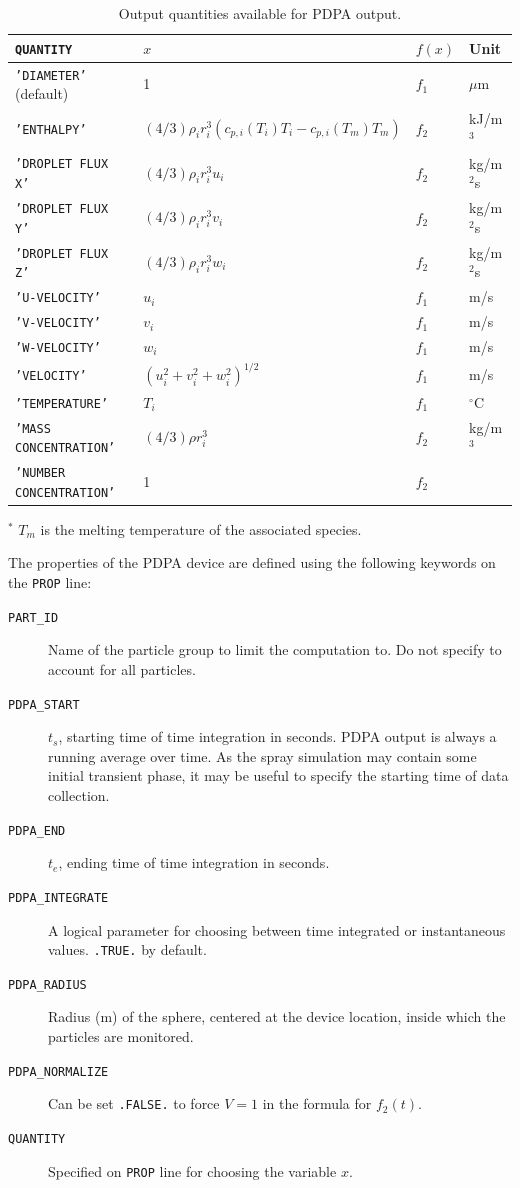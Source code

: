 \documentclass[11pt]{book}
\newcommand{\ct}{\tt\small}
\begin{document}
\begin{table}[!ht]
\caption{Output quantities available for PDPA output.}
\label{tbl:pdpa}
\begin{center}
\begin{tabular}{|l|l|l|l|}
\hline
{\ct QUANTITY} 	        & $x$   			& $f(x)$ & Unit \\ \hline
{\ct 'DIAMETER'} (default) & 1                          & $f_1$	 & $\mu$m \\
{\ct 'ENTHALPY'} 	& $(4/3)\rho_i r_i^3 \left(c_{p,i}(T_i)T_i-c_{p,i}(T_m)T_m \right)$	& $f_2$	 & kJ/m$^3$ \\
{\ct 'DROPLET FLUX X'} 	& $(4/3)\rho_i r_i^3 u_i$ 	& $f_2$	 & kg/m$^2$s \\
{\ct 'DROPLET FLUX Y'} 	& $(4/3)\rho_i r_i^3 v_i$ 	& $f_2$	 & kg/m$^2$s \\
{\ct 'DROPLET FLUX Z'} 	& $(4/3)\rho_i r_i^3 w_i$ 	& $f_2$	 & kg/m$^2$s \\
{\ct 'U-VELOCITY'} 	& $u_i$ 			& $f_1$	 & m/s \\
{\ct 'V-VELOCITY'} 	& $v_i$ 			& $f_1$	 & m/s \\
{\ct 'W-VELOCITY'}	& $w_i$ 			& $f_1$	 & m/s \\
{\ct 'VELOCITY'} 	& $(u_i^2+v_i^2+w_i^2)^{1/2}$ 	& $f_1$	 & m/s \\
{\ct 'TEMPERATURE'} 	& $T_i$				& $f_1$  & ${}^\circ$C \\
{\ct 'MASS CONCENTRATION'} & $(4/3)\rho r_i^3 $         & $f_2$  & kg/m$^3$ \\
{\ct 'NUMBER CONCENTRATION'} & 1                        & $f_2$  & \\
 \hline
\end{tabular}
\end{center}
${}^*$ $T_m$ is the melting temperature of the associated species.
\end{table}

The properties of the PDPA device are defined using the following keywords on the {\ct PROP} line:
\begin{description}
\item[{\ct PART\_ID}] Name of the particle group to limit the computation to. Do not specify to account for all particles.
\item[{\ct PDPA\_START}] $t_s$, starting time of time integration in seconds. PDPA output is always a running average over time.
As the spray simulation may contain some initial transient phase, it may be useful to specify the starting time of data collection.
\item[{\ct PDPA\_END}] $t_e$, ending time of time integration in seconds.
\item[{\ct PDPA\_INTEGRATE}] A logical parameter for choosing between time integrated or instantaneous values. {\ct .TRUE.} by default.
\item[{\ct PDPA\_RADIUS}] Radius (m) of the sphere, centered at the device location, inside which the particles are monitored.
\item[{\ct PDPA\_NORMALIZE}] Can be set {\ct .FALSE.} to force $V = 1$ in the formula for $f_2(t)$.
\item[{\ct QUANTITY}] Specified on {\ct PROP} line for choosing the variable $x$.
\end{description}
\end{document}
